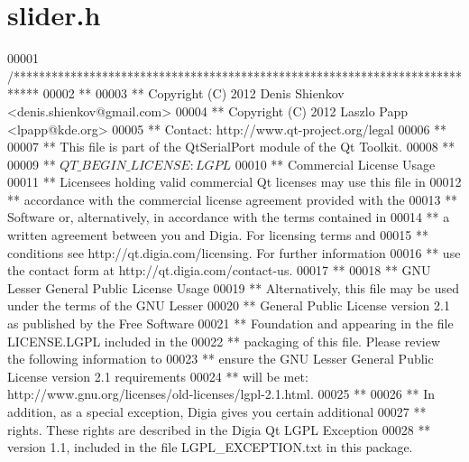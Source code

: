 \hypertarget{a00078_source}{\section{slider.\+h}
\label{a00078_source}
}

\begin{DoxyCode}
00001 \textcolor{comment}{/****************************************************************************}
00002 \textcolor{comment}{**}
00003 \textcolor{comment}{** Copyright (C) 2012 Denis Shienkov <denis.shienkov@gmail.com>}
00004 \textcolor{comment}{** Copyright (C) 2012 Laszlo Papp <lpapp@kde.org>}
00005 \textcolor{comment}{** Contact: http://www.qt-project.org/legal}
00006 \textcolor{comment}{**}
00007 \textcolor{comment}{** This file is part of the QtSerialPort module of the Qt Toolkit.}
00008 \textcolor{comment}{**}
00009 \textcolor{comment}{** $QT\_BEGIN\_LICENSE:LGPL$}
00010 \textcolor{comment}{** Commercial License Usage}
00011 \textcolor{comment}{** Licensees holding valid commercial Qt licenses may use this file in}
00012 \textcolor{comment}{** accordance with the commercial license agreement provided with the}
00013 \textcolor{comment}{** Software or, alternatively, in accordance with the terms contained in}
00014 \textcolor{comment}{** a written agreement between you and Digia.  For licensing terms and}
00015 \textcolor{comment}{** conditions see http://qt.digia.com/licensing.  For further information}
00016 \textcolor{comment}{** use the contact form at http://qt.digia.com/contact-us.}
00017 \textcolor{comment}{**}
00018 \textcolor{comment}{** GNU Lesser General Public License Usage}
00019 \textcolor{comment}{** Alternatively, this file may be used under the terms of the GNU Lesser}
00020 \textcolor{comment}{** General Public License version 2.1 as published by the Free Software}
00021 \textcolor{comment}{** Foundation and appearing in the file LICENSE.LGPL included in the}
00022 \textcolor{comment}{** packaging of this file.  Please review the following information to}
00023 \textcolor{comment}{** ensure the GNU Lesser General Public License version 2.1 requirements}
00024 \textcolor{comment}{** will be met: http://www.gnu.org/licenses/old-licenses/lgpl-2.1.html.}
00025 \textcolor{comment}{**}
00026 \textcolor{comment}{** In addition, as a special exception, Digia gives you certain additional}
00027 \textcolor{comment}{** rights.  These rights are described in the Digia Qt LGPL Exception}
00028 \textcolor{comment}{** version 1.1, included in the file LGPL\_EXCEPTION.txt in this package.}

\end{DoxyCode}
